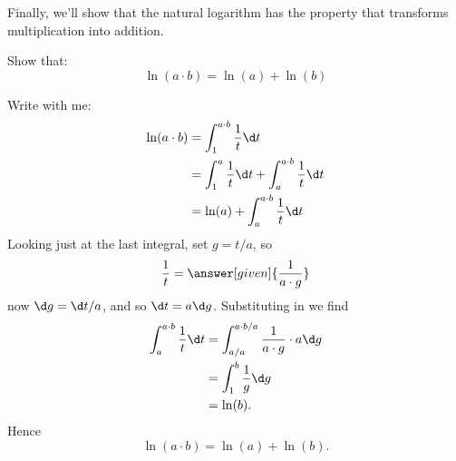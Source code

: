\documentclass{ximera}
\begin{document}
Finally, we'll show that the natural logarithm has the property that
transforms multiplication into addition.

\begin{example}
  Show that:
  \[
  \ln(a\cdot b) = \ln(a) + \ln(b)
  \]
  \begin{explanation}
    Write with me:
    \begin{align*}
      \ln(a\cdot b) &= \int_1^{a\cdot b} \frac{1}{t}\d t\\
      &= \int_1^{a} \frac{1}{t}\d t + \int_a^{a\cdot b} \frac{1}{t}\d t\\
      &= \ln(a) + \int_a^{a\cdot b} \frac{1}{t}\d t
    \end{align*}
    Looking just at the last integral, set $g= t/a$, so
    \[
    \frac{1}{t} = \answer[given]{\frac{1}{a\cdot g}}
    \]
    now $\d g = \d t/a$, and so $\d t= a \d g$. Substituting in we find
    \begin{align*}
      \int_a^{a\cdot b} \frac{1}{t}\d t &= \int_{a/a}^{a\cdot b/a} \frac{1}{a \cdot g} \cdot a \d g\\
      &= \int_{1}^{b} \frac{1}{g}\d g\\
      &= \ln(b).
    \end{align*}
    Hence
    \[
    \ln(a\cdot b) = \ln(a) + \ln(b).
    \]
  \end{explanation}
\end{example}
\end{document}

